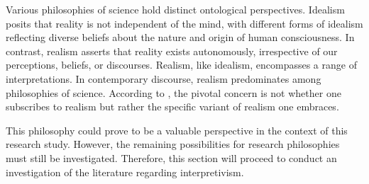 \par{Various philosophies of science hold distinct ontological perspectives. Idealism posits that reality is not independent of the mind, with different forms of idealism reflecting diverse beliefs about the nature and origin of human consciousness. In contrast, realism asserts that reality exists autonomously, irrespective of our perceptions, beliefs, or discourses. Realism, like idealism, encompasses a range of interpretations. In contemporary discourse, realism predominates among philosophies of science. According to \cite{bhaskar2013realist}, the pivotal concern is not whether one subscribes to realism but rather the specific variant of realism one embraces.}
\par{This philosophy could prove to be a valuable perspective in the context of this research study. However, the remaining possibilities for research philosophies must still be investigated. Therefore, this section will proceed to conduct an investigation of the literature regarding interpretivism.}
